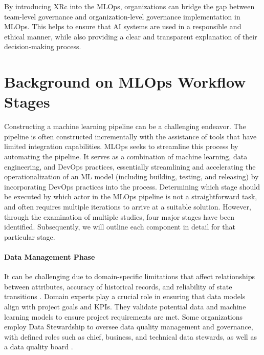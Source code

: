 \documentclass[conference]{IEEEtran}
\begin{document}
By introducing XRc into the MLOps, organizations can bridge the gap between team-level governance and organization-level governance implementation in MLOps. This helps to ensure that AI systems are used in a responsible and ethical manner, while also providing a clear and transparent explanation of their decision-making process.

\section{Background on MLOps Workflow Stages}
Constructing a machine learning pipeline can be a challenging endeavor. The pipeline is often constructed incrementally with the assistance of tools that have limited integration capabilities. MLOps seeks to streamline this process by automating the pipeline. It serves as a combination of machine learning, data engineering, and DevOps practices, essentially streamlining and accelerating the operationalization of an ML model (including building, testing, and releasing) by incorporating DevOps practices into the process. Determining which stage should be executed by which actor in the MLOps pipeline is not a straightforward task, and often requires multiple iterations to arrive at a suitable solution. However, through the examination of multiple studies, four major stages have been identified. Subsequently, we will outline each component in detail for that particular stage.
\paragraph{Data Management Phase} It can be challenging due to domain-specific limitations \cite{maydanchik2007data} that affect relationships between attributes, accuracy of historical records, and reliability of state transitions \cite{taleb2018big}. Domain experts play a crucial role in ensuring that data models align with project goals and KPIs. They validate potential data and machine learning models to ensure project requirements are met. Some organizations employ Data Stewardship to oversee data quality management and governance, with defined roles such as chief, business, and technical data stewards, as well as a data quality board \cite{mons2018data}.
\end{document}
